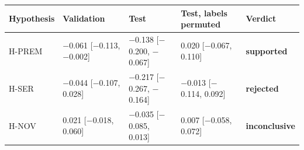 \begin{tabular}{lllll}\toprule
Hypothesis & Validation & Test & Test, labels permuted & Verdict\\\midrule
H-PREM & $-$0.061 [$-$0.113, $-$0.002] & $-$0.138 [$-$0.200, $-$0.067] & 0.020 [$-$0.067, 0.110] & \textbf{supported}\\
H-SER & $-$0.044 [$-$0.107, 0.028] & $-$0.217 [$-$0.267, $-$0.164] & $-$0.013 [$-$0.114, 0.092] & \textbf{rejected}\\
H-NOV & 0.021 [$-$0.018, 0.060] & $-$0.035 [$-$0.085, 0.013] & 0.007 [$-$0.058, 0.072] & \textbf{inconclusive}\\
\bottomrule
\end{tabular}
